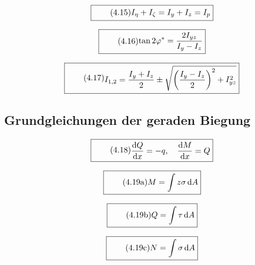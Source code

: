 \documentclass[11pt]{article}
\newcommand{\1}{ {\mathds{1}} }
\newcommand{\td}{\,\text{d}}
\begin{document}
\begin{multicols}{2}
		\begin{equation}
			\boxed{
				\tag{4.15}
				\begin{split}
					I_{\eta} + I_{\zeta} = I_y + I_z = I_p
				\end{split}
			}
		\end{equation}

		\begin{equation}
			\boxed{
				\tag{4.16}
				\begin{split}
					\tan{2\varphi^*} = \frac{2 I_{yz}}{I_y - I_z}
				\end{split}
			}
		\end{equation}

		\begin{equation}
			\boxed{
				\tag{4.17}
				\begin{split}
					I_{1,2} = \frac{I_y + I_z}{2}
					\pm
					\sqrt{\left(\frac{I_y - I_z}{2}\right)^2 + I_{yz}^2}		
				\end{split}
			}
		\end{equation}
		
		\subsection{Grundgleichungen der geraden Biegung}

		\begin{equation}
			\boxed{
				\tag{4.18}
				\begin{split}
					\frac{\text{d}Q}{\text{d}x} = -q,\quad \frac{\text{d}M}{\text{d}x} = Q
				\end{split}
			}
		\end{equation}

		\begin{equation}
			\boxed{
				\tag{4.19a}
				\begin{split}
					M = \int z \sigma \td A
				\end{split}
			}
		\end{equation}


		\begin{equation}
			\boxed{
				\tag{4.19b}
				\begin{split}
					Q = \int \tau \td A
				\end{split}
			}
		\end{equation}

		\begin{equation}
			\boxed{
				\tag{4.19c}
				\begin{split}
					N = \int \sigma \td A
				\end{split}
			}
		\end{equation}


\end{multicols}
\end{document}
